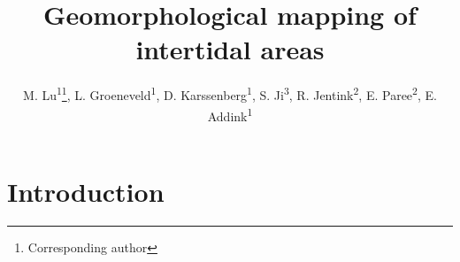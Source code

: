 \documentclass{isprs} %
\begin{document}
\title{Geomorphological mapping of intertidal areas 
}
\version{}

\author{
 M. Lu\textsuperscript{1}\thanks{Corresponding author}, 
 L. Groeneveld\textsuperscript{1}, 
 D. Karssenberg\textsuperscript{1},
 S. Ji\textsuperscript{3}, 
 R. Jentink\textsuperscript{2}, 
 E. Paree\textsuperscript{2},
 E. Addink\textsuperscript{1}}

\address{
	\textsuperscript{1} Department of Physical Geography, Utrecht University, the Netherlands lumeng0312@gmail.com\\
	\textsuperscript{2} Rijkswaterstaat CIV, the Netherlands \\
	\textsuperscript{3} Department of remote sensing and information engineering, Wuhan University, China. \\
	}



\icwg{}   %



\maketitle


\section{Introduction}\label{Introduction}
 
\sloppy
\end{document}
